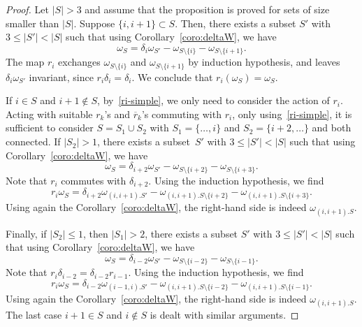 \documentclass[pdftex]{sigma}
\numberwithin{equation}{section}
\theoremstyle{definition}
\newcommand{\rb}{\overline{r}}
\begin{document}
\begin{proof}
Let $|S|>3$ and assume that the proposition is proved for sets of size smaller than $|S|$. Suppose $\{i,i+1\}\subset S$. Then, there exists a subset $S'$ with $3\leq |S'|<|S|$ such that using Corollary~\ref{coro:deltaW}, we have
\begin{equation*}
\omega_{S} = \delta_i\omega_{S'}-\omega_{S\setminus\{i\}}-\omega_{S\setminus\{i+1\}}.
\end{equation*}
The map $r_i$ exchanges $\omega_{S\setminus\{i\}}$ and $\omega_{S\setminus\{i+1\}}$
by induction hypothesis, and leaves $ \delta_i\omega_{S'}$ invariant, since $r_i\delta_i=\delta_i$.
We conclude that $r_i(\omega_{S}) =\omega_{S}$.

If $i\in S$ and $i+1\not\in S$, by~\eqref{ri-simple}, we only need to consider the action of $r_i$. Acting with suitable $r_k$'s and $\rb_k$'s commuting with $r_i$, only using~\eqref{ri-simple}, it is sufficient to consider
$S=S_1\cup S_2$ with $S_1=\{\dots,i\}$ and $S_2=\{i+2,\dots\}$ and both connected.
If $|S_2|>1$, there exists a subset~$S'$ with $3\leq |S'|<|S|$ such that using Corollary~\ref{coro:deltaW}, we have
\begin{equation*}
\omega_{S} = \delta_{i+2}\omega_{S'}-\omega_{S\setminus\{i+2\}}-\omega_{S\setminus\{i+3\}}.
\end{equation*}
Note that $r_i$ commutes with $\delta_{i+2}$. Using the induction hypothesis, we find
\begin{equation*}
r_i\omega_{S} = \delta_{i+2}\omega_{(i,i+1).S'}-\omega_{(i,i+1).S\setminus\{i+2\}}-\omega_{(i,i+1).S\setminus\{i+3\}}.
\end{equation*}
Using again the Corollary~\ref{coro:deltaW}, the right-hand side is indeed $\omega_{(i,i+1).S}$.

Finally, if $|S_2|\leq1$, then $|S_1|>2$, there exists a subset $S'$ with $3\leq |S'|<|S|$ such that using Corollary~\ref{coro:deltaW}, we have
\begin{equation*}
\omega_{S} = \delta_{i-2}\omega_{S'}-\omega_{S\setminus\{i-2\}}-\omega_{S\setminus\{i-1\}}.
\end{equation*}
Note that $r_i\delta_{i-2}=\delta_{i-2}r_{i-1}$. Using the induction hypothesis, we find
\begin{equation*}
r_i\omega_{S} = \delta_{i-2}\omega_{(i-1,i).S'}-\omega_{(i,i+1).S\setminus\{i-2\}}-\omega_{(i,i+1).S\setminus\{i-1\}}.
\end{equation*}
Using again the Corollary~\ref{coro:deltaW}, the right-hand side is indeed $\omega_{(i,i+1).S}$. The last case $i+1\in S$ and $i\not\in S$ is dealt with similar arguments.
\end{proof}
\end{document}
